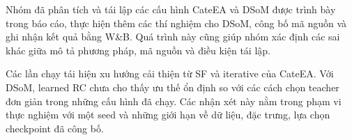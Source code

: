Nhóm đã phân tích và tái lập các cấu hình CateEA và DSoM
được trình bày trong báo cáo, thực hiện thêm các thí nghiệm
cho DSoM, công bố mã nguồn và ghi nhận kết quả bằng W\&B.
Quá trình này cũng giúp nhóm xác định các sai khác giữa mô
tả phương pháp, mã nguồn và điều kiện tái lập.

Các lần chạy tái hiện xu hướng cải thiện từ SF và iterative
của CateEA. Với DSoM, learned RC chưa cho thấy ưu thế ổn định
so với các cách chọn teacher đơn giản trong những cấu hình
đã chạy. Các nhận xét này nằm trong phạm vi thực nghiệm với
một seed và những giới hạn về dữ liệu, đặc trưng, lựa chọn
checkpoint đã công bố.
